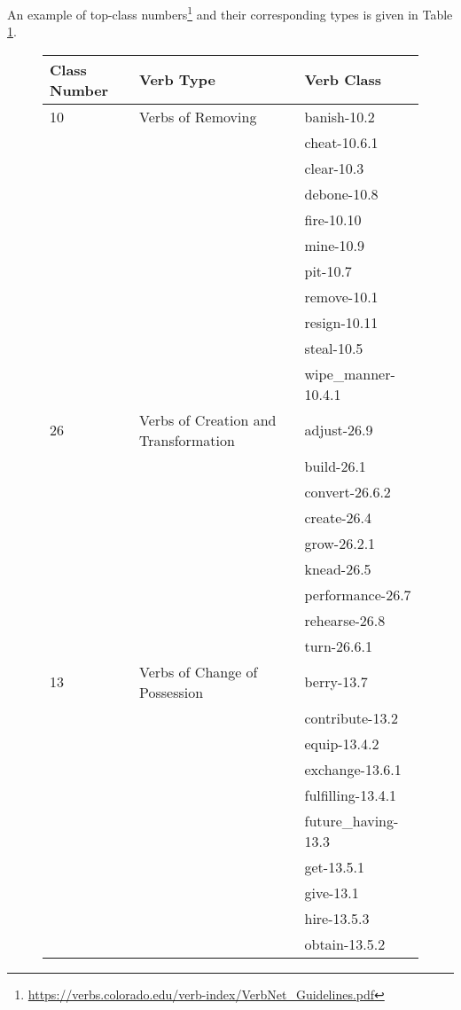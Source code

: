 An example of top-class numbers\footnote{\href{https://verbs.colorado.edu/verb-index/VerbNet_Guidelines.pdf}{https://verbs.colorado.edu/verb-index/VerbNet\_Guidelines.pdf}} and their corresponding types is given in Table \ref{tb:vtype_example}.
\begin{figure}[h]
\begingroup
\scriptsize
\centering
\begin{tabularx}{12cm}{l  l  l}
\hline
Class Number	&Verb Type	&Verb Class \\
\hline 
\hline
10&	Verbs of Removing		&banish-10.2 \\
&&cheat-10.6.1\\
&&clear-10.3\\
&&debone-10.8\\
&&fire-10.10\\
&&mine-10.9\\
&&pit-10.7\\
&&remove-10.1\\
&&resign-10.11\\
&&steal-10.5\\
&&wipe\_manner-10.4.1\\
\hline
26	&Verbs of Creation and Transformation	&adjust-26.9 \\
&&build-26.1 \\
&&convert-26.6.2\\
&&create-26.4\\
&&grow-26.2.1\\
&&knead-26.5\\
&&performance-26.7\\
&&rehearse-26.8\\
&&turn-26.6.1\\
\hline
13&	Verbs of Change of Possession	&berry-13.7 \\
&&contribute-13.2\\
&&equip-13.4.2\\
&&exchange-13.6.1\\
&&fulfilling-13.4.1\\
&&future\_having-13.3\\
&&get-13.5.1\\
&&give-13.1\\
&&hire-13.5.3\\
&&obtain-13.5.2\\

\end{tabularx}

\label{tb:vtype_example}


\endgroup
\end{figure}
